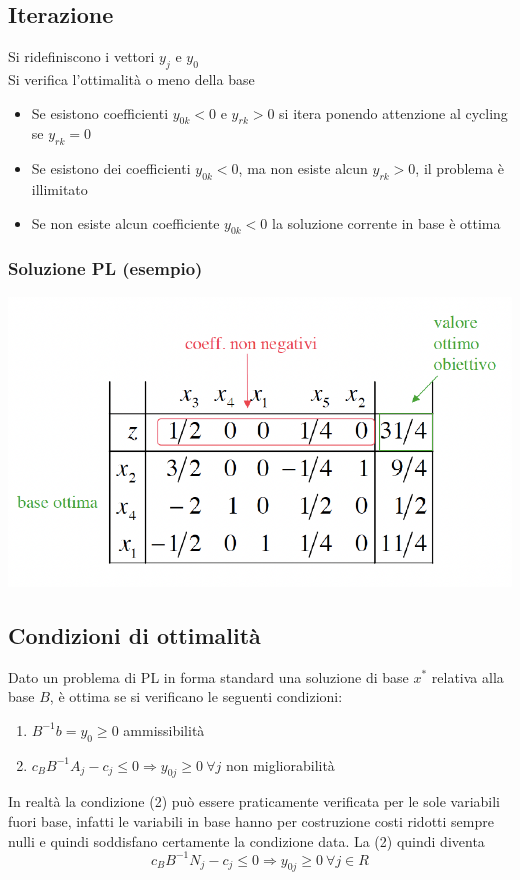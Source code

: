 \documentclass[12pt,a4paper]{article}
\begin{document}
\subsection{Iterazione}
Si ridefiniscono i vettori $y_j$ e $y_0$\\
Si verifica l'ottimalità o meno della base\begin{itemize}
\item Se esistono coefficienti $y_{0k}<0$ e $y_{rk} > 0$ si itera ponendo attenzione al cycling se $y_{rk}=0$
\item Se esistono dei coefficienti $y_{0k} < 0$, ma non esiste alcun $y_{rk}>0$, il problema è illimitato
\item Se non esiste alcun coefficiente $y_{0k}<0$ la soluzione corrente in base è ottima
\end{itemize}

\subsubsection{Soluzione PL (esempio)}
\begin{center}
\includegraphics[width=0.5\columnwidth]{img/soles_iterazione.png}
\end{center} 

\subsection{Condizioni di ottimalità}
 Dato un problema di PL in forma standard una soluzione di base $x^*$ relativa alla base $B$, è ottima se si verificano le seguenti condizioni:
\begin{enumerate}
\item $B^{-1}b=y_0 \geq 0$ ammissibilità
\item $c_BB^{-1}A_j-c_j \leq 0 \Rightarrow y_{0j} \geq 0 \ \forall j$ non migliorabilità
\end{enumerate}
In realtà la condizione (2) può essere praticamente verificata per le sole variabili fuori base, infatti le variabili in base hanno per costruzione costi ridotti sempre nulli e quindi soddisfano
certamente la condizione data. La (2) quindi diventa $$c_BB^{-1}N_j-c_j \leq 0 \Rightarrow y_{0j} \geq 0\ \forall j \in R$$
 
\end{document}
